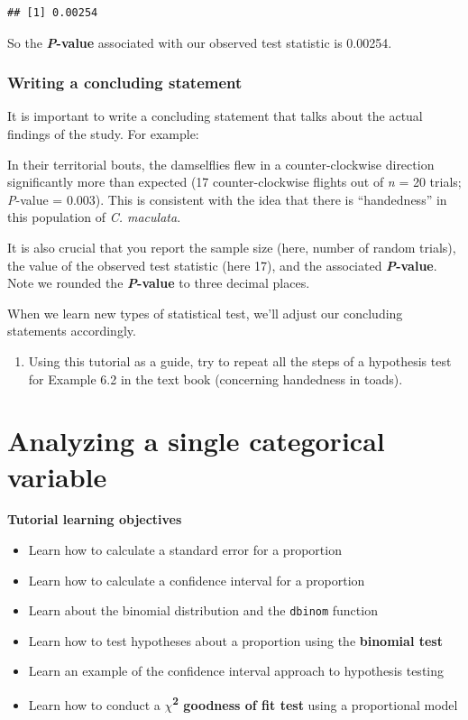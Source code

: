 \documentclass[
]{book}
\providecommand{\tightlist}{%
  \setlength{\itemsep}{0pt}\setlength{\parskip}{0pt}}
\begin{document}
\begin{verbatim}
## [1] 0.00254
\end{verbatim}

So the \textbf{\emph{P}-value} associated with our observed test statistic is 0.00254.

\subsection{Writing a concluding statement}\label{concluding_statement}

It is important to write a concluding statement that talks about the actual findings of the study. For example:

In their territorial bouts, the damselflies flew in a counter-clockwise direction significantly more than expected (17 counter-clockwise flights out of \emph{n} = 20 trials; \emph{P}-value = 0.003). This is consistent with the idea that there is ``handedness'' in this population of \emph{C. maculata}.

It is also crucial that you report the sample size (here, number of random trials), the value of the observed test statistic (here 17), and the associated \textbf{\emph{P}-value}. Note we rounded the \textbf{\emph{P}-value} to three decimal places.

When we learn new types of statistical test, we'll adjust our concluding statements accordingly.

\begin{enumerate}
\def\labelenumi{\arabic{enumi}.}
\tightlist
\item
  Using this tutorial as a guide, try to repeat all the steps of a hypothesis test for Example 6.2 in the text book (concerning handedness in toads).
\end{enumerate}

\chapter{Analyzing a single categorical variable}\label{single_cat}

\textbf{Tutorial learning objectives}

\begin{itemize}
\tightlist
\item
  Learn how to calculate a standard error for a proportion
\item
  Learn how to calculate a confidence interval for a proportion
\item
  Learn about the binomial distribution and the \texttt{dbinom} function
\item
  Learn how to test hypotheses about a proportion using the \textbf{binomial test}
\item
  Learn an example of the confidence interval approach to hypothesis testing
\item
  Learn how to conduct a \textbf{\(\chi\)\textsuperscript{2} goodness of fit test} using a proportional model
\end{itemize}
\end{document}

